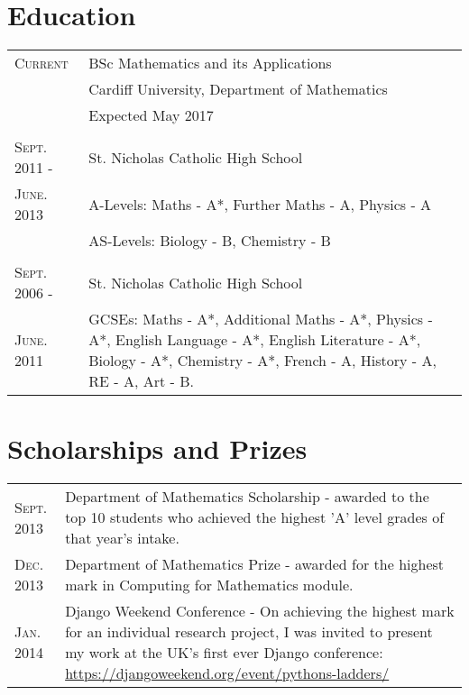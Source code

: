 \documentclass[a4paper]{article}
\begin{document}
\section{Education}
\begin{tabularx}{\textwidth}{lX}

\textsc{Current} & \textsc BSc Mathematics and its Applications \\
&\normalsize Cardiff University, Department of Mathematics\\
& Expected May 2017\\
\\
\textsc{Sept. 2011 -} & St. Nicholas Catholic High School\\
\textsc{June. 2013} & A-Levels: Maths - A*, Further Maths - A, Physics - A\\
& AS-Levels: Biology - B, Chemistry - B\\
\\
\textsc{Sept. 2006 -} & St. Nicholas Catholic High School\\
\textsc{June. 2011} & GCSEs: Maths - A*, Additional Maths - A*, Physics - A*, English Language - A*, English Literature - A*, Biology - A*, Chemistry - A*, French - A, History - A, RE - A, Art - B.\\

\end{tabularx}
\section{Scholarships and Prizes}
\begin{tabularx}{\textwidth}{lX}

\textsc{Sept.} 2013 & Department of Mathematics Scholarship - awarded to the top 10 students who achieved the highest 'A' level grades of that year's intake.\\
\textsc{Dec.} 2013 & Department of Mathematics Prize - awarded for the highest mark in Computing for Mathematics module.\\
\textsc{Jan.} 2014 & Django Weekend Conference - On achieving the highest mark for an individual research project, I was invited to present my work at the UK's first ever Django conference: \url{https://djangoweekend.org/event/pythons-ladders/}\\

\end{tabularx}
\newpage
\end{document}
